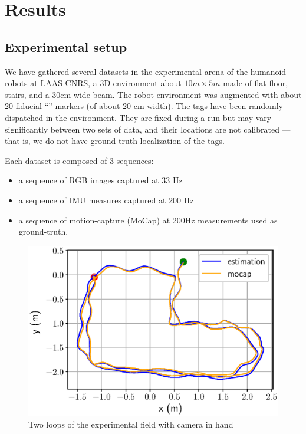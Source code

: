 \section{Results}

\subsection{Experimental setup}
We have gathered several datasets in the experimental arena of the humanoid robots at LAAS-CNRS, a 3D environment about $10m \times 5m$ made of flat floor, 
stairs, and a 30cm wide beam.
The robot environment was augmented with about 20 fiducial ``\apriltag'' markers (of about 20 cm width).
The tags have been randomly dispatched in the environment.
They are fixed during a run but may vary significantly between two sets of data, and their locations are not calibrated ---that is, we do not have ground-truth localization of the tags.

Each dataset is composed of 3 sequences:
\begin{itemize}
    \item a sequence of RGB images captured at 33 Hz
    \item a sequence of IMU measures captured at 200 Hz
    \item a sequence of motion-capture (MoCap) at 200Hz measurements used as ground-truth.
\end{itemize}


\begin{figure}[t]
    \centering
    \includegraphics[scale=0.8]{figures/absolute/xy_loop_twice.eps}
    \caption{Two loops of the experimental field with camera in hand}
    \label{fig:xy_loop_twice}
\end{figure}

